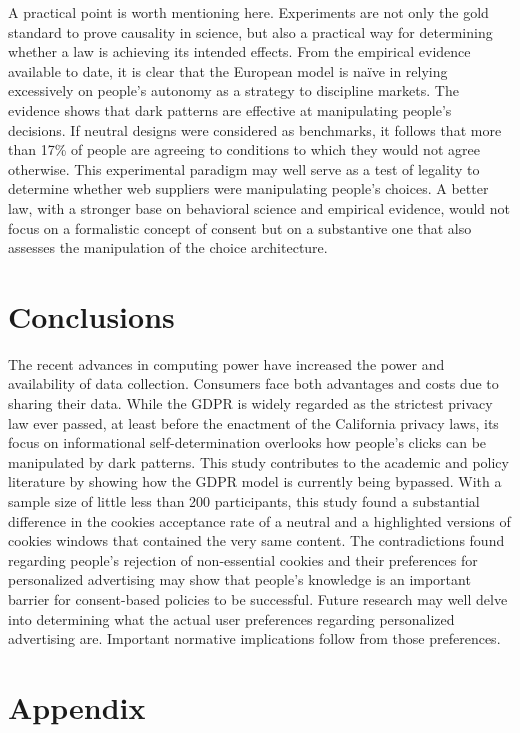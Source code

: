 \documentclass[
  11pt,
  letterpaper,
]{article}
\begin{document}
A practical point is worth mentioning here. Experiments are not only the gold standard to prove causality in science, but also a practical way for determining whether a law is achieving its intended effects. From the empirical evidence available to date, it is clear that the European model is naïve in relying excessively on people's autonomy as a strategy to discipline markets. The evidence shows that dark patterns are effective at manipulating people's decisions. If neutral designs were considered as benchmarks, it follows that more than 17\% of people are agreeing to conditions to which they would not agree otherwise. This experimental paradigm may well serve as a test of legality to determine whether web suppliers were manipulating people's choices. A better law, with a stronger base on behavioral science and empirical evidence, would not focus on a formalistic concept of consent but on a substantive one that also assesses the manipulation of the choice architecture.

\hypertarget{conclusions}{%
\section{Conclusions}\label{conclusions}}

The recent advances in computing power have increased the power and availability of data collection. Consumers face both advantages and costs due to sharing their data. While the GDPR is widely regarded as the strictest privacy law ever passed, at least before the enactment of the California privacy laws, its focus on informational self-determination overlooks how people's clicks can be manipulated by dark patterns. This study contributes to the academic and policy literature by showing how the GDPR model is currently being bypassed. With a sample size of little less than 200 participants, this study found a substantial difference in the cookies acceptance rate of a neutral and a highlighted versions of cookies windows that contained the very same content. The contradictions found regarding people's rejection of non-essential cookies and their preferences for personalized advertising may show that people's knowledge is an important barrier for consent-based policies to be successful. Future research may well delve into determining what the actual user preferences regarding personalized advertising are. Important normative implications follow from those preferences.

\pagebreak

\hypertarget{appendix}{%
\section{Appendix}\label{appendix}}
\end{document}
